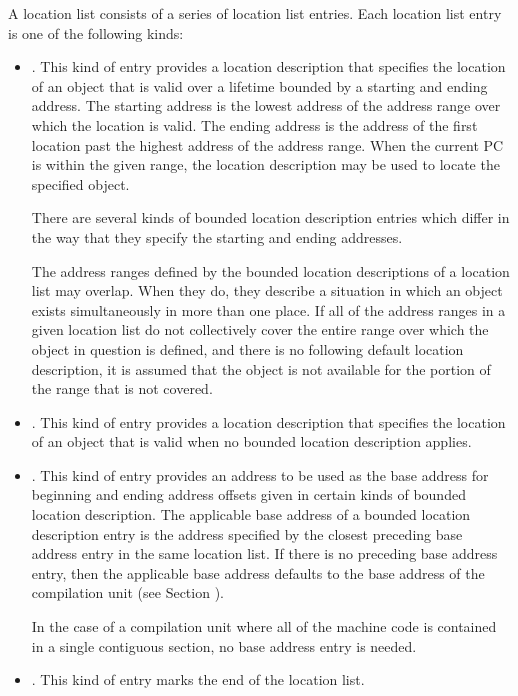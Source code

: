 A location list consists of a series of location list entries.
Each location list entry is one of the following kinds:
\begin{itemize}
\item {}. 
This kind of entry provides a
location description that specifies the location of
an object that is valid over a lifetime bounded
by a starting and ending address. The starting address is the
lowest address of the address range over which the location
is valid. The ending address is the address of the first
location past the highest address of the address range.
When the current PC is within the given range, the location
description may be used to locate the specified object.
        
There are several kinds of bounded location description
entries which differ in the way that they specify the
starting and ending addresses.
        
The address ranges defined by the bounded location descriptions
of a location list may overlap. When they do, they describe a
situation in which an object exists simultaneously in more than
one place. If all of the address ranges in a given location
list do not collectively cover the entire range over which the
object in question is defined, and there is no following default
location description, it is assumed that the object is not
available for the portion of the range that is not covered.

\item {}.
This kind of entry provides a
location description that specifies the location of
an object that is valid when no bounded location description
applies.

\item {}.
This kind of entry provides an address to be
used as the base address for beginning and ending address
offsets given in certain kinds of bounded location description.
The applicable base address of a bounded location description
entry is the address specified by the closest preceding base
address entry in the same location list. If there is no
preceding base address entry, then the applicable base address
defaults to the base address of the compilation unit (see
Section ).

In the case of a compilation unit where all of the machine
code is contained in a single contiguous section, no base
address entry is needed.

\item  {}.
This kind of entry marks the end of the location list.

\end{itemize}

